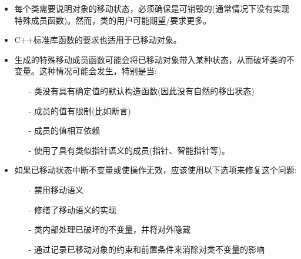 \begin{itemize}
	\item 每个类需要说明对象的移动状态，必须确保是可销毁的(通常情况下没有实现特殊成员函数)。然而，类的用户可能期望/要求更多。
	\item C++标准库函数的要求也适用于已移动对象。
	\item 生成的特殊移动成员函数可能会将已移动对象带入某种状态，从而破坏类的不变量。这种情况可能会发生，特别是当:
	\begin{itemize}
		\item[-] 类没有具有确定值的默认构造函数(因此没有自然的移出状态)
		\item[-] 成员的值有限制(比如断言)
		\item[-] 成员的值相互依赖
		\item[-] 使用了具有类似指针语义的成员(指针、智能指针等)。
	\end{itemize}
	\item 如果已移动状态中断不变量或使操作无效，应该使用以下选项来修复这个问题:
	\begin{itemize}
		\item[-] 禁用移动语义
		\item[-] 修缮了移动语义的实现
		\item[-] 类内部处理已破坏的不变量，并将对外隐藏
		\item[-] 通过记录已移动对象的约束和前置条件来消除对类不变量的影响
	\end{itemize}
\end{itemize}


